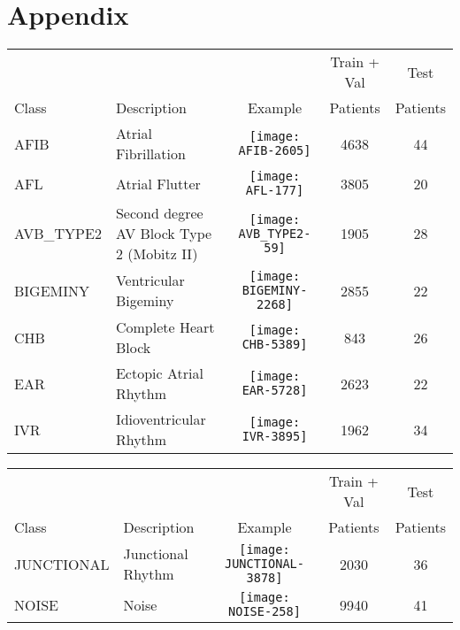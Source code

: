 \documentclass{article}
\begin{document}



\begin{table*}
\vspace{-12em}
\section*{Appendix}
\vspace{4em}
\centering
\small
\begin{tabular}{m{2cm} m{2cm} ccc}
\toprule
 & &  & Train + Val & Test \\
Class & Description & Example & Patients & Patients  \\
\midrule
	AFIB & Atrial Fibrillation & \parbox[c]{13em}{\vspace*{1mm}\texttt{[image: AFIB-2605]}} & 4638 & 44 \\
    AFL & Atrial Flutter & \parbox[c]{13em}{\vspace*{1mm}\texttt{[image: AFL-177]}} & 3805 & 20 \\
    AVB\_TYPE2 & Second degree AV Block Type 2 (Mobitz II) & \parbox[c]{13em}{\texttt{[image: AVB\_TYPE2-59]}} & 1905  & 28 \\
    BIGEMINY & Ventricular Bigeminy & \parbox[c]{13em}{\texttt{[image: BIGEMINY-2268]}} & 2855 & 22 \\
    CHB & Complete Heart Block & \parbox[c]{13em}{\texttt{[image: CHB-5389]}} & 843 & 26 \\
    EAR & Ectopic Atrial Rhythm & \parbox[c]{13em}{\texttt{[image: EAR-5728]}} & 2623 & 22 \\
    IVR & Idioventricular Rhythm & \parbox[c]{13em}{\texttt{[image: IVR-3895]}} & 1962 & 34 \\
\end{tabular}
\end{table*}\begin{table*}
\centering
\small
\begin{tabular}{m{2cm} m{2cm} ccc}
\toprule
 & &  & Train + Val & Test \\
Class & Description & Example & Patients & Patients  \\
\midrule
	JUNCTIONAL & Junctional Rhythm & \parbox[c]{13em}{\vspace*{1mm}\texttt{[image: JUNCTIONAL-3878]}} & 2030 & 36 \\
    NOISE & Noise & \parbox[c]{13em}{\texttt{[image: NOISE-258]}} & 9940 & 41 \\

\end{tabular}
\end{table*}
\end{document}
